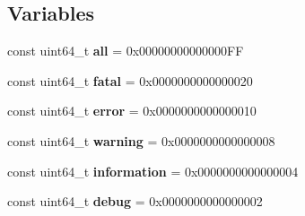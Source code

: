 \subsection*{Variables}
\begin{DoxyCompactItemize}
\item 
\mbox{\label{namespace_g_a_1_1loglevel_afd59244a2773df14653a08d10924298b}} 
const uint64\+\_\+t {\bfseries all} = 0x00\textquotesingle{}00\textquotesingle{}00\textquotesingle{}00\textquotesingle{}00\textquotesingle{}00\textquotesingle{}00\textquotesingle{}\+FF
\item 
\mbox{\label{namespace_g_a_1_1loglevel_a0cc8d7951f036f4b819ee0b1a04ec8ca}} 
const uint64\+\_\+t {\bfseries fatal} = 0x00\textquotesingle{}00\textquotesingle{}00\textquotesingle{}00\textquotesingle{}00\textquotesingle{}00\textquotesingle{}00\textquotesingle{}20
\item 
\mbox{\label{namespace_g_a_1_1loglevel_a8d35bba4b491010381be09e460493c1c}} 
const uint64\+\_\+t {\bfseries error} = 0x00\textquotesingle{}00\textquotesingle{}00\textquotesingle{}00\textquotesingle{}00\textquotesingle{}00\textquotesingle{}00\textquotesingle{}10
\item 
\mbox{\label{namespace_g_a_1_1loglevel_a2efe57d3158d4bc6500b2f54eed47a53}} 
const uint64\+\_\+t {\bfseries warning} = 0x00\textquotesingle{}00\textquotesingle{}00\textquotesingle{}00\textquotesingle{}00\textquotesingle{}00\textquotesingle{}00\textquotesingle{}08
\item 
\mbox{\label{namespace_g_a_1_1loglevel_a6815fbf833f109a73f2c0bfc950f3541}} 
const uint64\+\_\+t {\bfseries information} = 0x00\textquotesingle{}00\textquotesingle{}00\textquotesingle{}00\textquotesingle{}00\textquotesingle{}00\textquotesingle{}00\textquotesingle{}04
\item 
\mbox{\label{namespace_g_a_1_1loglevel_aa4c41c7c0eac6c12a0c38a3dd1e143b0}} 
const uint64\+\_\+t {\bfseries debug} = 0x00\textquotesingle{}00\textquotesingle{}00\textquotesingle{}00\textquotesingle{}00\textquotesingle{}00\textquotesingle{}00\textquotesingle{}02
\item 
\mbox{\label{namespace_g_a_1_1loglevel_a02a2b6d92ecc953e8a50d8371912698f}} 

\end{DoxyCompactItemize}
